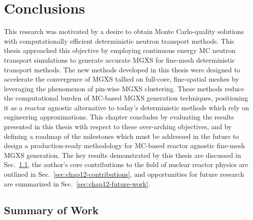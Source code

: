 \chapter{Conclusions}
\label{chap:conclusions-future-work}

This research was motivated by a desire to obtain Monte Carlo-quality solutions with computationally efficient deterministic neutron transport methods. This thesis approached this objective by employing continuous energy \ac{MC} neutron transport simulations to generate accurate \ac{MGXS} for fine-mesh deterministic transport methods. The new methods developed in this thesis were designed to accelerate the convergence of \ac{MGXS} tallied on full-core, fine-spatial meshes by leveraging the phenomenon of pin-wise \ac{MGXS} clustering. These methods reduce the computational burden of \ac{MC}-based \ac{MGXS} generation techniques, positioning it as a reactor agnostic alternative to today's deterministic methods which rely on engineering approximations. This chapter concludes by evaluating the results presented in this thesis with respect to these over-arching objectives, and by defining a roadmap of the milestones which must be addressed in the future to design a production-ready methodology for \ac{MC}-based reactor agnostic fine-mesh \ac{MGXS} generation. The key results demonstrated by this thesis are discussed in Sec.~\ref{sec:chap12-conclusions}, the author's core contributions to the field of nuclear reactor physics are outlined in Sec.~\ref{sec:chap12-contributions}, and opportunities for future research are summarized in Sec.~\ref{sec:chap12-future-work}.



\section{Summary of Work}
\label{sec:chap12-conclusions}


